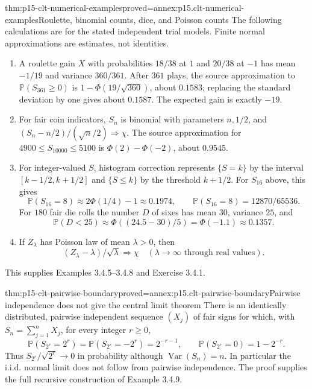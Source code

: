 \begin{hbtheorem}{thm:p15-clt-numerical-examples}{proved=annex:p15.clt-numerical-examples}{Roulette, binomial counts, dice, and Poisson counts}
The following calculations are for the stated independent trial models.
Finite normal approximations are estimates, not identities.
\begin{enumerate}
\item A roulette gain \(X\) with probabilities \(18/38\) at \(1\)
and \(20/38\) at \(-1\) has mean \(-1/19\) and variance
\(360/361\). After \(361\) plays, the source approximation to
\(\mathbb P(S_{361}\geq0)\) is
\(1-\Phi(19/\sqrt{360})\), about \(0.1583\);
replacing the standard deviation by one gives about \(0.1587\).
The expected gain is exactly \(-19\).
\item For fair coin indicators, \(S_n\) is binomial with parameters
\(n,1/2\), and
\((S_n-n/2)/(\sqrt n/2)\Rightarrow\chi\).
The source approximation for \(4900\leq S_{10000}\leq5100\) is
\(\Phi(2)-\Phi(-2)\), about \(0.9545\).
\item For integer-valued \(S\), histogram correction represents
\(\{S=k\}\) by the interval \([k-1/2,k+1/2]\) and
\(\{S\leq k\}\) by the threshold \(k+1/2\).
For \(S_{16}\) above, this gives
\[
 \mathbb P(S_{16}=8)\approx2\Phi(1/4)-1\approx0.1974,
 \qquad \mathbb P(S_{16}=8)=12870/65536.
 \]
For \(180\) fair die rolls the number \(D\) of sixes has mean
\(30\), variance \(25\), and
\[
 \mathbb P(D<25)\approx
 \Phi((24.5-30)/5)=\Phi(-1.1)\approx0.1357.
 \]
\item If \(Z_\lambda\) has Poisson law of mean \(\lambda>0\), then
\[
 (Z_\lambda-\lambda)/\sqrt\lambda\Rightarrow\chi
                         \quad(\lambda\to\infty\text{ through real values}).
 \]
\end{enumerate}
This supplies Examples 3.4.5--3.4.8 and Exercise 3.4.1.
\end{hbtheorem}

\begin{hbtheorem}{thm:p15-clt-pairwise-boundary}{proved=annex:p15.clt-pairwise-boundary}{Pairwise independence does not give the central limit theorem}
There is an identically distributed, pairwise independent sequence
\((X_j)\) of fair signs for which, with \(S_n=\sum_{j=1}^nX_j\),
for every integer \(r\geq0\),
\[
 \mathbb P(S_{2^r}=2^r)=\mathbb P(S_{2^r}=-2^r)=2^{-r-1},
 \qquad \mathbb P(S_{2^r}=0)=1-2^{-r}.
 \]
Thus \(S_{2^r}/\sqrt{2^r}\to0\) in probability although
\(\operatorname{Var}(S_n)=n\). In particular the i.i.d. normal
limit does not follow from pairwise independence.
The proof supplies the full recursive construction of Example 3.4.9.
\end{hbtheorem}

